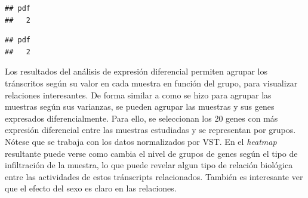 \documentclass[
]{article}
\newenvironment{Shaded}{\begin{snugshade}}{\end{snugshade}}
\newcommand{\DataTypeTok}[1]{\textcolor[rgb]{0.13,0.29,0.53}{#1}}
\newcommand{\DecValTok}[1]{\textcolor[rgb]{0.00,0.00,0.81}{#1}}
\newcommand{\FloatTok}[1]{\textcolor[rgb]{0.00,0.00,0.81}{#1}}
\newcommand{\KeywordTok}[1]{\textcolor[rgb]{0.13,0.29,0.53}{\textbf{#1}}}
\newcommand{\NormalTok}[1]{#1}
\newcommand{\OperatorTok}[1]{\textcolor[rgb]{0.81,0.36,0.00}{\textbf{#1}}}
\newcommand{\StringTok}[1]{\textcolor[rgb]{0.31,0.60,0.02}{#1}}
\begin{document}
\begin{verbatim}
## pdf 
##   2
\end{verbatim}

\begin{Shaded}
\end{Shaded}

\begin{verbatim}
## pdf 
##   2
\end{verbatim}

Los resultados del análisis de expresión diferencial permiten agrupar
los tránscritos según su valor en cada muestra en función del grupo,
para visualizar relaciones interesantes. De forma similar a como se hizo
para agrupar las muestras según sus varianzas, se pueden agrupar las
muestras y sus genes expresados diferencialmente. Para ello, se
seleccionan los 20 genes con más expresión diferencial entre las
muestras estudiadas y se representan por grupos. Nótese que se trabaja
con los datos normalizados por VST. En el \emph{heatmap} resultante
puede verse como cambia el nivel de grupos de genes según el tipo de
infiltración de la muestra, lo que puede revelar algun tipo de relación
biológica entre las actividades de estos tránscripts relacionados.
También es interesante ver que el efecto del sexo es claro en las
relaciones.
\end{document}
